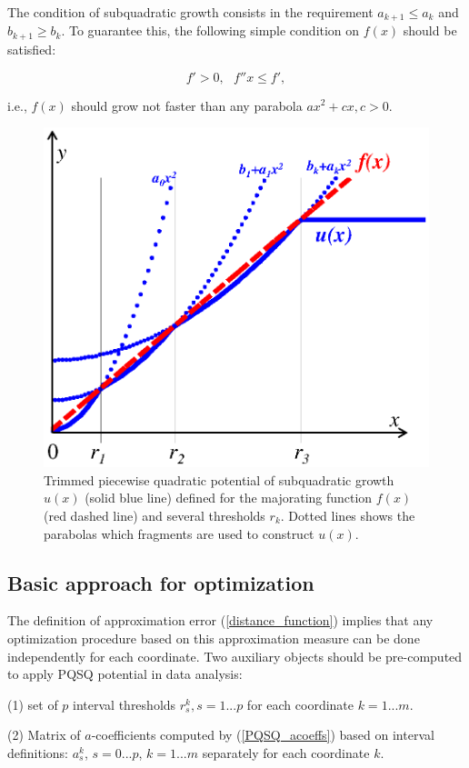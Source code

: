 \documentclass[preprint,12pt]{elsarticle}
\begin{document}
The condition of subquadratic growth consists in the requirement $a_{k+1}\leq a_{k}$ and $b_{k+1} \geq b_{k}$. To guarantee this, the following simple condition on $f(x)$ should be satisfied:

\begin{equation}
\label{eq:condition_function}
f'>0, \>\>\> f''x \leq f',
\end{equation}

\noindent i.e., $f(x)$ should grow not faster than any parabola $ax^2+cx, c>0$.

\begin{figure}[h]
\centering\includegraphics[width=0.6\linewidth]{potential.eps}
\caption{Trimmed piecewise quadratic potential of subquadratic growth $u(x)$ (solid blue line) defined for the majorating function $f(x)$ (red dashed line) and several thresholds $r_k$. Dotted lines shows the parabolas which fragments are used to construct $u(x)$.\label{potential}}
\end{figure}

\subsection{Basic approach for optimization}

The definition of approximation error (\ref{distance_function}) implies that any optimization procedure based on this approximation measure can be done independently for each coordinate. Two auxiliary objects should be pre-computed to apply PQSQ potential in data analysis:

(1) set of $p$ interval thresholds $r_s^k, s=1...p$ for each coordinate $k=1...m$.

(2) Matrix of $a$-coefficients computed by (\ref{PQSQ_acoeffs}) based on interval definitions: $a_s^k$, $s=0...p$, $k=1...m$ separately for each coordinate $k$.
\end{document}
